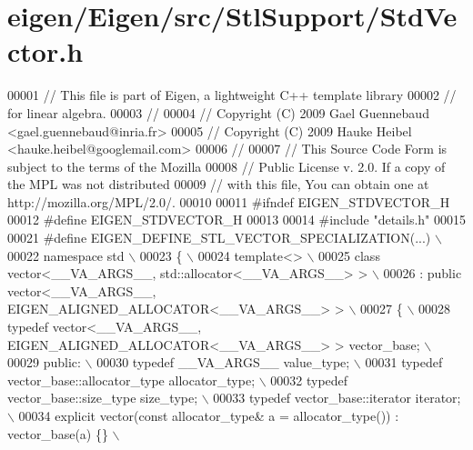 \hypertarget{eigen_2_eigen_2src_2_stl_support_2_std_vector_8h_source}{}\section{eigen/\+Eigen/src/\+Stl\+Support/\+Std\+Vector.h}
\label{eigen_2_eigen_2src_2_stl_support_2_std_vector_8h_source}

\begin{DoxyCode}
00001 \textcolor{comment}{// This file is part of Eigen, a lightweight C++ template library}
00002 \textcolor{comment}{// for linear algebra.}
00003 \textcolor{comment}{//}
00004 \textcolor{comment}{// Copyright (C) 2009 Gael Guennebaud <gael.guennebaud@inria.fr>}
00005 \textcolor{comment}{// Copyright (C) 2009 Hauke Heibel <hauke.heibel@googlemail.com>}
00006 \textcolor{comment}{//}
00007 \textcolor{comment}{// This Source Code Form is subject to the terms of the Mozilla}
00008 \textcolor{comment}{// Public License v. 2.0. If a copy of the MPL was not distributed}
00009 \textcolor{comment}{// with this file, You can obtain one at http://mozilla.org/MPL/2.0/.}
00010 
00011 \textcolor{preprocessor}{#ifndef EIGEN\_STDVECTOR\_H}
00012 \textcolor{preprocessor}{#define EIGEN\_STDVECTOR\_H}
00013 
00014 \textcolor{preprocessor}{#include "details.h"}
00015 
00021 \textcolor{preprocessor}{#define EIGEN\_DEFINE\_STL\_VECTOR\_SPECIALIZATION(...) \(\backslash\)}
00022 \textcolor{preprocessor}{namespace std \(\backslash\)}
00023 \textcolor{preprocessor}{\{ \(\backslash\)}
00024 \textcolor{preprocessor}{  template<> \(\backslash\)}
00025 \textcolor{preprocessor}{  class vector<\_\_VA\_ARGS\_\_, std::allocator<\_\_VA\_ARGS\_\_> >  \(\backslash\)}
00026 \textcolor{preprocessor}{    : public vector<\_\_VA\_ARGS\_\_, EIGEN\_ALIGNED\_ALLOCATOR<\_\_VA\_ARGS\_\_> > \(\backslash\)}
00027 \textcolor{preprocessor}{  \{ \(\backslash\)}
00028 \textcolor{preprocessor}{    typedef vector<\_\_VA\_ARGS\_\_, EIGEN\_ALIGNED\_ALLOCATOR<\_\_VA\_ARGS\_\_> > vector\_base; \(\backslash\)}
00029 \textcolor{preprocessor}{  public: \(\backslash\)}
00030 \textcolor{preprocessor}{    typedef \_\_VA\_ARGS\_\_ value\_type; \(\backslash\)}
00031 \textcolor{preprocessor}{    typedef vector\_base::allocator\_type allocator\_type; \(\backslash\)}
00032 \textcolor{preprocessor}{    typedef vector\_base::size\_type size\_type;  \(\backslash\)}
00033 \textcolor{preprocessor}{    typedef vector\_base::iterator iterator;  \(\backslash\)}
00034 \textcolor{preprocessor}{    explicit vector(const allocator\_type& a = allocator\_type()) : vector\_base(a) \{\}  \(\backslash\)}

\end{DoxyCode}
